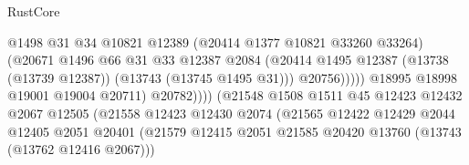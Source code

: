 \begin{lexlean}{RustCore}
\begin{coremodule}
                                                  @1498
                                                  @31
                                                  @34
                                                  @10821
                                                  @12389
                                                  (@20414 @1377 @10821 @33260 @33264)
                                                  (@20671
                                                    @1496
                                                    @66
                                                    @31
                                                    @33
                                                    @12387
                                                    @2084
                                                    (@20414
                                                      @1495
                                                      @12387
                                                      (@13738 (@13739 @12387))
                                                      (@13743 (@13745 @1495 @31)))
                                                    @20756)))))
                                          @18995
                                          @18998
                                          @19001
                                          @19004
                                          @20711)
                                        @20782))))
                                (@21548
                                  @1508
                                  @1511
                                  @45
                                  @12423
                                  @12432
                                  @2067
                                  @12505
                                  (@21558
                                    @12423
                                    @12430
                                    @2074
                                    (@21565
                                      @12422
                                      @12429
                                      @2044
                                      @12405
                                      @2051
                                      @20401
                                      (@21579
                                        @12415
                                        @2051
                                        @21585
                                        @20420
                                        @13760
                                        (@13743 (@13762 @12416 @2067)))

\end{coremodule}
\end{lexlean}
